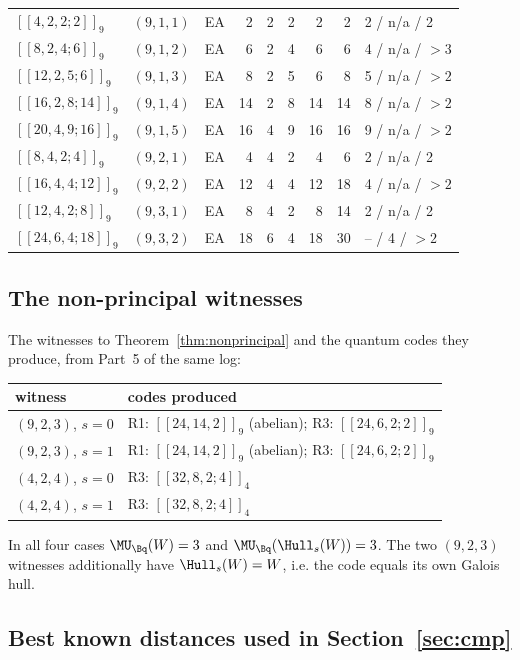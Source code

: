 \begin{table}[ht]
\begin{tabular}{@{}llcrrrrrl@{}}
$[[4,2,2;2]]_9$  & $(9,1,1)$ & EA & 2  & 2  & 2  & 2  & 2  & 2 / n/a / 2\\
$[[8,2,4;6]]_9$  & $(9,1,2)$ & EA & 6  & 2  & 4  & 6  & 6  & 4 / n/a / $>3$\\
$[[12,2,5;6]]_9$ & $(9,1,3)$ & EA & 8  & 2  & 5  & 6  & 8  & 5 / n/a / $>2$\\
$[[16,2,8;14]]_9$ & $(9,1,4)$ & EA & 14 & 2  & 8  & 14 & 14 & 8 / n/a / $>2$\\
$[[20,4,9;16]]_9$ & $(9,1,5)$ & EA & 16 & 4  & 9  & 16 & 16 & 9 / n/a / $>2$\\
$[[8,4,2;4]]_9$  & $(9,2,1)$ & EA & 4  & 4  & 2  & 4  & 6  & 2 / n/a / 2\\
$[[16,4,4;12]]_9$ & $(9,2,2)$ & EA & 12 & 4  & 4  & 12 & 18 & 4 / n/a / $>2$\\
$[[12,4,2;8]]_9$ & $(9,3,1)$ & EA & 8  & 4  & 2  & 8  & 14 & 2 / n/a / 2\\
$[[24,6,4;18]]_9$ & $(9,3,2)$ & EA & 18 & 6  & 4  & 18 & 30 & -- / 4 / $>2$\\
\bottomrule
\end{tabular}
\end{table}

\subsection{The non-principal witnesses}

The witnesses to Theorem~\ref{thm:nonprincipal} and the quantum codes they
produce, from Part~5 of the same log:

\begin{center}
\begin{tabular}{@{}ll@{}}
\toprule
witness & codes produced\\\midrule
$(9,2,3)$, $s=0$ & R1: $[[24,14,2]]_9$ (abelian); R3: $[[24,6,2;2]]_9$\\
$(9,2,3)$, $s=1$ & R1: $[[24,14,2]]_9$ (abelian); R3: $[[24,6,2;2]]_9$\\
$(4,2,4)$, $s=0$ & R3: $[[32,8,2;4]]_4$\\
$(4,2,4)$, $s=1$ & R3: $[[32,8,2;4]]_4$\\
\bottomrule
\end{tabular}
\end{center}

In all four cases $\MU_{\Bq}(W)=3$ and $\MU_{\Bq}(\Hull_s(W))=3$. The two
$(9,2,3)$ witnesses additionally have $\Hull_s(W)=W$, i.e. the code equals its
own Galois hull.

\subsection{Best known distances used in Section~\ref{sec:cmp}}

